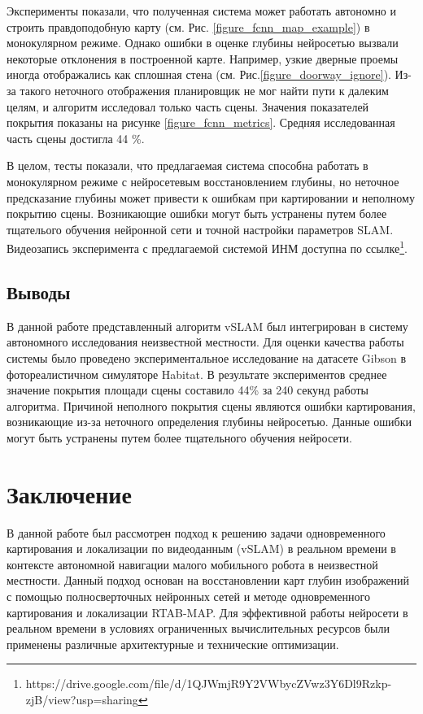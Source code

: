 \documentclass{mipt-thesis-ms}
\begin{document}
	Эксперименты показали, что полученная система может работать автономно и строить правдоподобную карту (см. Рис. \ref{figure_fcnn_map_example}) в монокулярном режиме. Однако ошибки в оценке глубины нейросетью вызвали некоторые отклонения в построенной карте. Например, узкие дверные проемы иногда отображались как сплошная стена (см. Рис.\ref{figure_doorway_ignore}). Из-за такого неточного отображения планировщик не мог найти пути к далеким целям, и алгоритм исследовал только часть сцены. Значения показателей покрытия показаны на рисунке \ref{figure_fcnn_metrics}. Средняя исследованная часть сцены достигла 44 \%.
	
	В целом, тесты показали, что предлагаемая система способна работать в монокулярном режиме с нейросетевым восстановлением глубины, но неточное предсказание глубины может привести к ошибкам при картировании и неполному покрытию сцены. Возникающие ошибки могут быть устранены путем более тщателього обучения нейронной сети и точной настройки параметров SLAM. Видеозапись эксперимента с предлагаемой системой ИНМ доступна по ссылке\footnote{https://drive.google.com/file/d/1QJWmjR9Y2VWbycZVwz3Y6Dl9Rzkp-zjB/view?usp=sharing}.
	
	\section{Выводы}
	
	В данной работе представленный алгоритм vSLAM был интегрирован в систему автономного исследования неизвестной местности. Для оценки качества работы системы было проведено экспериментальное исследование на датасете Gibson в фотореалистичном симуляторе Habitat. В результате экспериментов среднее значение покрытия площади сцены составило 44\% за 240 секунд работы алгоритма. Причиной неполного покрытия сцены являются ошибки картирования, возникающие из-за неточного определения глубины нейросетью. Данные ошибки могут быть устранены путем более тщательного обучения нейросети.
	
	
	\chapter{Заключение}
	
	В данной работе был рассмотрен подход к решению задачи одновременного картирования и локализации по видеоданным (vSLAM) в реальном времени в контексте автономной навигации малого мобильного робота в неизвестной местности. Данный подход основан на восстановлении карт глубин изображений с помощью полносверточных нейронных сетей и методе одновременного картирования и локализации RTAB-MAP. Для эффективной работы нейросети в реальном времени в условиях ограниченных вычислительных ресурсов были применены различные архитектурные и технические оптимизации.
	
\end{document}
